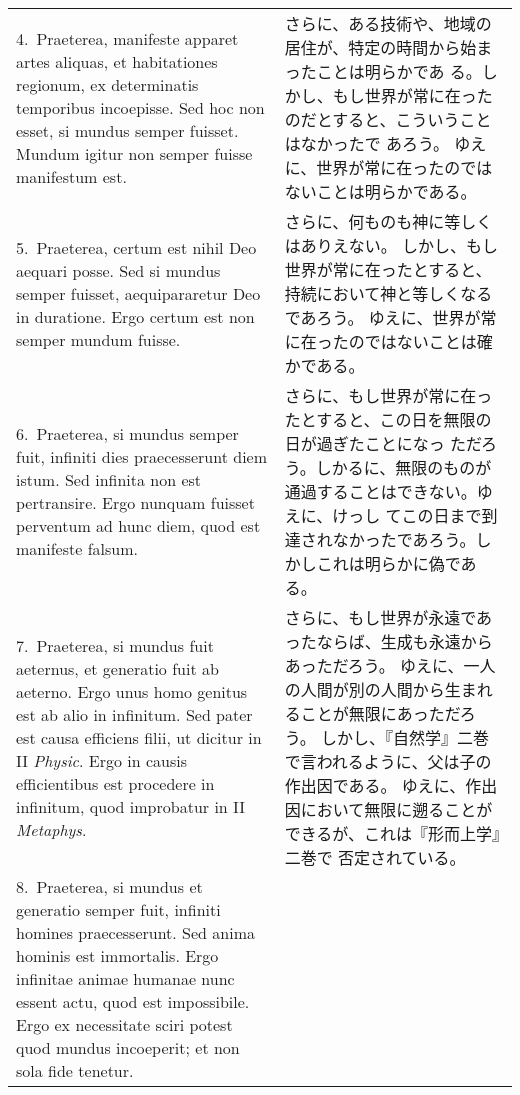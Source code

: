 \documentclass[10pt]{jsarticle} %
\begin{document}
\begin{longtable}{p{21em}p{21em}}
\\


4.~{\sc Praeterea}, manifeste apparet artes aliquas, et habitationes
 regionum, ex determinatis temporibus incoepisse. Sed hoc non esset, si
 mundus semper fuisset. Mundum igitur non semper fuisse manifestum est.


&
さらに、ある技術や、地域の居住が、特定の時間から始まったことは明らかであ
 る。しかし、もし世界が常に在ったのだとすると、こういうことはなかったで
 あろう。
ゆえに、世界が常に在ったのではないことは明らかである。

\\


5.~{\sc Praeterea}, certum est nihil Deo aequari posse. Sed si mundus
 semper fuisset, aequipararetur Deo in duratione. Ergo certum est non
 semper mundum fuisse.

&
さらに、何ものも神に等しくはありえない。
しかし、もし世界が常に在ったとすると、持続において神と等しくなるであろう。
 ゆえに、世界が常に在ったのではないことは確かである。

\\


6.~{\sc Praeterea}, si mundus semper fuit, infiniti dies praecesserunt
 diem istum. Sed infinita non est pertransire. Ergo nunquam fuisset
 perventum ad hunc diem, quod est manifeste falsum.

&

さらに、もし世界が常に在ったとすると、この日を無限の日が過ぎたことになっ
 ただろう。しかるに、無限のものが通過することはできない。ゆえに、けっし
 てこの日まで到達されなかったであろう。しかしこれは明らかに偽である。

\\


7.~{\sc Praeterea}, si mundus fuit aeternus, et generatio fuit ab
 aeterno. Ergo unus homo genitus est ab alio in infinitum. Sed pater est
 causa efficiens filii, ut dicitur in II {\it Physic}. Ergo in causis
 efficientibus est procedere in infinitum, quod improbatur in II
 {\it Metaphys}.

&
さらに、もし世界が永遠であったならば、生成も永遠からあっただろう。
ゆえに、一人の人間が別の人間から生まれることが無限にあっただろう。
しかし、『自然学』二巻で言われるように、父は子の作出因である。
ゆえに、作出因において無限に遡ることができるが、これは『形而上学』二巻で
 否定されている。

\\


8.~{\sc Praeterea}, si mundus et generatio semper fuit, infiniti homines
 praecesserunt. Sed anima hominis est immortalis. Ergo infinitae animae
 humanae nunc essent actu, quod est impossibile. Ergo ex necessitate
 sciri potest quod mundus incoeperit; et non sola fide tenetur.


\end{longtable}
\end{document}
